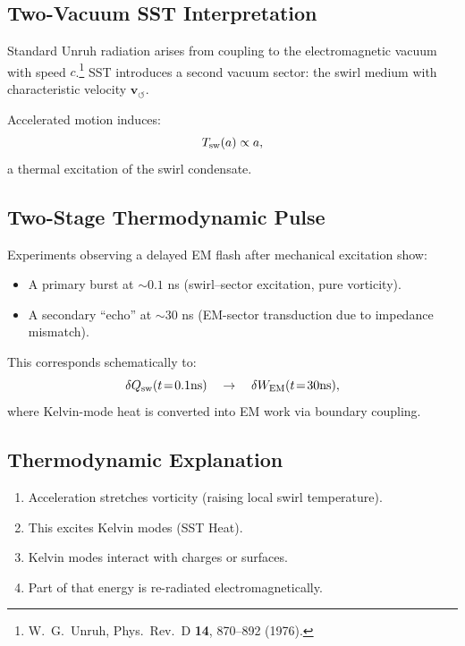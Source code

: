 \documentclass[11pt]{article}
\begin{document}
        \subsection{Two-Vacuum SST Interpretation}

            Standard Unruh radiation arises from coupling to the electromagnetic vacuum with
            speed $c$.\footnote{W.~G.~Unruh, Phys.\ Rev.\ D \textbf{14}, 870--892 (1976).}
            SST introduces a second vacuum sector: the swirl medium with
            characteristic velocity $\mathbf{v}_{\scriptscriptstyle\boldsymbol{\circlearrowleft}}$.

            Accelerated motion induces:
            \begin{equation}
                T_{\rm sw}(a) \propto a,
            \end{equation}
            a thermal excitation of the swirl condensate.

        \subsection{Two-Stage Thermodynamic Pulse}

            Experiments observing a delayed EM flash after mechanical excitation show:
            \begin{itemize}
                \item A primary burst at $\sim 0.1$ ns
                (swirl--sector excitation, pure vorticity).
                \item A secondary ``echo'' at $\sim 30$ ns
                (EM-sector transduction due to impedance mismatch).
            \end{itemize}

            This corresponds schematically to:
            \begin{equation}
                \delta Q_{\rm sw}(t \!=\! 0.1{\rm ns})
                \quad\rightarrow\quad
                \delta W_{\rm EM}(t \!=\! 30{\rm ns}),
            \end{equation}
            where Kelvin-mode heat is converted into EM work via boundary coupling.

        \subsection{Thermodynamic Explanation}

            \begin{enumerate}
                \item Acceleration stretches vorticity (raising local swirl temperature).
                \item This excites Kelvin modes (SST Heat).
                \item Kelvin modes interact with charges or surfaces.
                \item Part of that energy is re-radiated electromagnetically.
            \end{enumerate}
\end{document}
